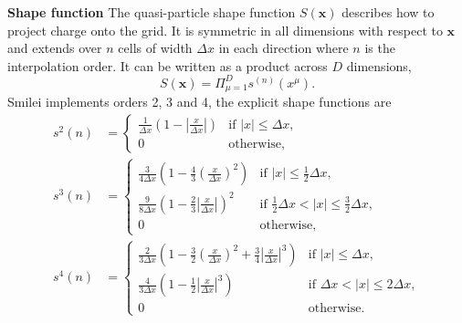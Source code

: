 \textbf{Shape function} The quasi-particle shape function $S(\mathbf{x})$ describes how to project charge onto the grid. It is symmetric in all dimensions with respect to $\mathbf{x}$ and extends over $n$ cells of width $\Delta x$ in each direction where $n$ is the interpolation order. It can be written as a product across $D$ dimensions,
\begin{equation}
	S(\mathbf{x}) = \Pi^D_{\mu = 1}s^{(n)}(x^\mu).
\end{equation}
Smilei implements orders 2, 3 and 4, the explicit shape functions are
\begin{subequations}
	\begin{align}
	s^2 (n) &= \begin{cases}
		\frac{1}{\Delta x}\left(1-\left|\frac{x}{\Delta x}\right| \right)  & \text{if } |x| \le \Delta x, \\
		0  & \text{otherwise,}
	\end{cases} \\
	s^3(n) &= \begin{cases}
		\frac{3}{4\Delta x}\left(1-\frac{4}{3}\left(\frac{x}{\Delta x}\right)^2 \right)  & \text{if } |x| \le \frac{1}{2}\Delta x, \\
		\frac{9}{8\Delta x}\left(1-\frac{2}{3}\left|\frac{x}{\Delta x}\right| \right)^2  & \text{if } \frac{1}{2}\Delta x <|x| \le \frac{3}{2} \Delta x, \\
		0  & \text{otherwise,}
	\end{cases}  \\
		s^4(n) &= \begin{cases}
		\frac{2}{3 \Delta x}\left( 1-\frac{3}{2}\left(\frac{x}{\Delta x}\right)^2 + \frac{3}{4}\left| \frac{x}{\Delta x}\right| ^3 \right)  & \text{if } |x| \le \Delta x, \\
		\frac{4}{3 \Delta x}\left(1-\frac{1}{2}\left|\frac{x}{\Delta x}\right| ^3 \right)  & \text{if } \Delta x <|x| \le 2\Delta x, \\
		0  & \text{otherwise.}
	\end{cases} 
	\end{align}
\end{subequations}

